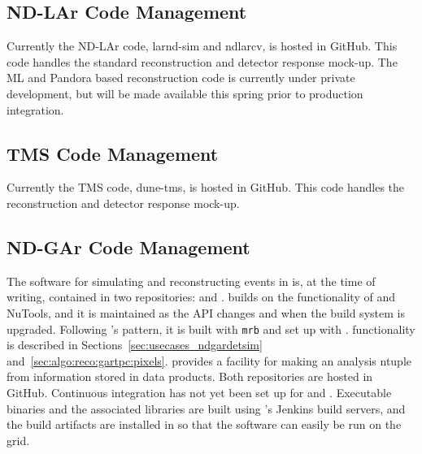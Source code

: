 \documentclass[../main-v1.tex]{subfiles}
\begin{document}
\subsection{ND-LAr Code Management}
\label{sec:codemgmt:ndlar}

Currently the ND-LAr code, larnd-sim and ndlarcv, is hosted in GitHub. This code handles the standard reconstruction and detector response mock-up. The ML and Pandora based reconstruction code is currently under private development, but will be made available this spring prior to production integration.  

\subsection{TMS Code Management}
\label{sec:codemgmt:tms}

Currently the TMS code, dune-tms, is hosted in GitHub. This code handles the reconstruction and detector response mock-up. 

\subsection{ND-GAr Code Management}
\label{sec:codemgmt:ndgar}

The software for simulating and reconstructing events in  is, at the time of writing, contained in two repositories:   and .   builds on the functionality of  and NuTools, and it is maintained as the  API changes and when the build system is upgraded.  Following 's pattern, it is built with {\tt mrb} and set up with .   %
 functionality is described in Sections~\ref{sec:usecases_ndgardetsim} and~\ref{sec:algo:reco:gartpc:pixels}.   provides a facility for making an analysis ntuple from information stored in  data products.  Both repositories are hosted in GitHub.  Continuous integration has not yet been set up for  and .  Executable binaries and the associated libraries are built using 's Jenkins build servers, and the build artifacts are installed in  so that the software can easily be run on the grid.
\end{document}

